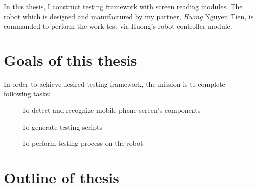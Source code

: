In this thesis, I construct testing framework with screen reading modules. The robot which is designed and manufactured by my partner, \textit{Huong} Nguyen Tien, is commanded to perform the work test via Huong's robot controller module.

\section{Goals of this thesis}
In order to achieve desired testing framework, the mission is to complete following tasks:
	\begin{itemize}
		\item[--] To detect and recognize mobile phone screen's components
		\item[--] To generate testing scripts
		\item[--] To perform testing process on the robot
	\end{itemize}

\section{Outline of thesis}
